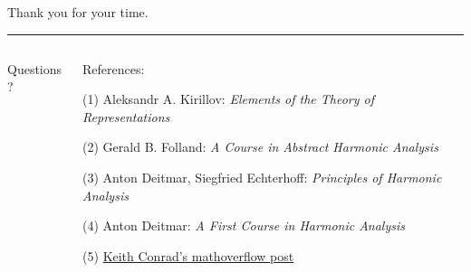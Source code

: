 \documentclass[mathserif
]{beamer}
\begin{document}
\begin{frame}
    \begin{flushright}
        {\color{darkgold60}Thank you for your time.}
        \end{flushright}
        \hrule\pause
    \begin{columns}
    \begin{column}{0.3\textwidth}
        \begin{block}{}{
        \begin{center}\Large  Questions?\end{center}}
        \end{block}\vspace{0em}
    \end{column}
    \begin{column}{0.7\textwidth}
        \begin{block}{}{
        \begin{center}\Large  References:\end{center}}
    \end{block}
(1) Aleksandr A. Kirillov: \textit{Elements of the Theory of Representations}

(2) Gerald B. Folland: \textit{A Course in Abstract Harmonic Analysis}

(3) Anton Deitmar, Siegfried Echterhoff: \textit{Principles of Harmonic Analysis}

(4) Anton Deitmar: \textit{A First Course in Harmonic Analysis}

(5) \textcolor{blue}{\href{https://mathoverflow.net/a/89520}{Keith Conrad's mathoverflow post}}%
    \end{column}
    \end{columns}
\end{frame}

\end{document}
